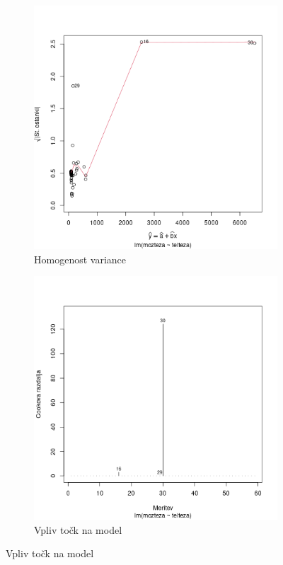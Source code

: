 \begin{figure}[h]
    \begin{subfigure}[t]{0.49\textwidth}
        \includegraphics[width=\textwidth]{res/homogenost-variance.png}
        \caption{Homogenost variance}
        \label{img:homogenost-variance}
    \end{subfigure}
    \hfill
    \begin{subfigure}[t]{0.49\textwidth}
        \includegraphics[width=\textwidth]{res/vpliv-tock-na-model.png}
        \caption{Vpliv točk na model}
        \label{img:vpliv-tock-na-model}
    \end{subfigure}
\end{figure}

